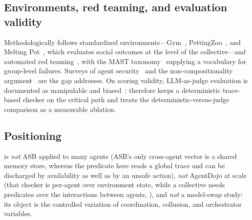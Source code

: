 \subsection{Environments, red teaming, and evaluation validity}
Methodologically  follows standardized environments---Gym~\cite{brockman2016openaigym},
PettingZoo~\cite{terry2021pettingzoo}, and Melting Pot~\cite{leibo2021meltingpot}, which
evaluates social outcomes at the level of the collective---and automated red
teaming~\cite{perez2022redteaming}, with the MAST taxonomy~\cite{cemri2025mast} supplying a
vocabulary for group-level failures. Surveys of agent
security~\cite{he2025emerged,li2024personalllmagents} and the non-compositionality
argument~\cite{schroederdewitt2025masec,hammond2025multiagent} are the gap 
addresses. On scoring validity, LLM-as-judge evaluation is documented as manipulable and
biased~\cite{zheng2023judging,wang2023fair};  therefore keeps a deterministic
trace-based checker on the critical path and treats the deterministic-versus-judge comparison
as a measurable ablation.

\subsection{Positioning}
 is \emph{not} ASB applied to many agents (ASB's only cross-agent vector is a shared
memory store, whereas the predicate here reads a global trace and can be discharged by
availability as well as by an unsafe action), \emph{not} AgentDojo at scale (that checker is
per-agent over environment state, while a collective needs predicates over the interactions
between agents, ), and \emph{not} a model-swap study: its object is the
controlled variation of coordination, collusion, and orchestrator variables.

